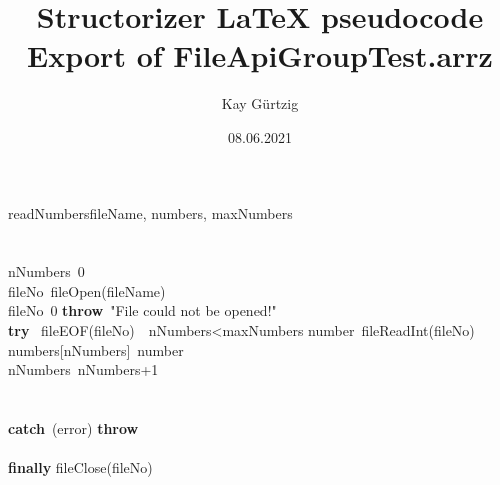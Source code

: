 \documentclass[a4paper,10pt]{article}
\title{Structorizer LaTeX pseudocode Export of FileApiGroupTest.arrz}
\author{Kay Gürtzig}
\date{08.06.2021}
\begin{document}
\begin{pseudocode}{readNumbers}{fileName, numbers, maxNumbers }
\label{readNumbers}
\\
\\
\\
  nNumbers\gets\ 0\\
  fileNo\gets\ fileOpen(fileName)\\
  \IF fileNo\leq\ 0 \THEN
    \textbf{throw}\ "File could not be opened!"\\
  \textbf{try} \BEGIN
    \WHILE \NOT\ fileEOF(fileNo)\ \AND\ nNumbers<maxNumbers \DO
    \BEGIN
      number\gets\ fileReadInt(fileNo)\\
      numbers[nNumbers]\gets\ number\\
      nNumbers\gets\ nNumbers+1\\
    \END\\
  \END\\
  \textbf{catch}\ (error)\BEGIN
    \textbf{throw}\ \\
  \END\\
  \textbf{finally} \BEGIN
    fileClose(fileNo)\\
  \END\\
  \\
\ENDPROCEDURE
\end{pseudocode}
\end{document}
